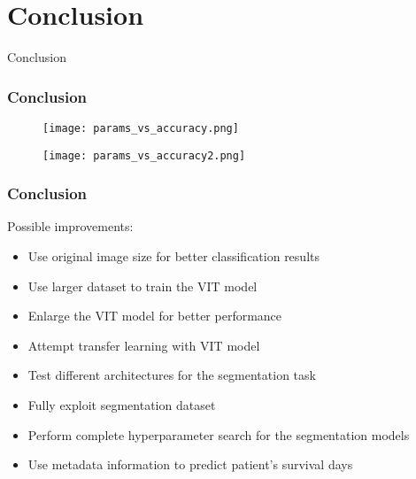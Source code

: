 \documentclass[../presentation.tex]{subfiles} %
\begin{document}
\section{Conclusion}

\begin{frame}
	\begin{cbox}
		{\fontsize{20pt}{7.2}\selectfont Conclusion}
	\end{cbox}
\end{frame}

\begin{frame}
    
    \frametitle{Conclusion}

		\begin{minipage}{0.49\textwidth}
			\begin{figure}
				\centering
				\texttt{[image: params\_vs\_accuracy.png]}
			\end{figure}
		\end{minipage}
			\hfill
		\begin{minipage}{0.49\textwidth}
			\begin{figure}
				\centering
				\texttt{[image: params\_vs\_accuracy2.png]}
			\end{figure}
		\end{minipage}

\end{frame}

\begin{frame}
    
    \frametitle{Conclusion}

    Possible improvements:
    \vspace{0.2cm}
    \begin{itemize}
        \item Use original image size for better classification results
        \item Use larger dataset to train the VIT model
        \item Enlarge the VIT model for better performance
        \item Attempt transfer learning with VIT model
        \item Test different architectures for the segmentation task
        \item Fully exploit segmentation dataset
        \item Perform complete hyperparameter search for the segmentation models
        \item Use metadata information to predict patient's survival days
    \end{itemize}

\end{frame}
\end{document}
